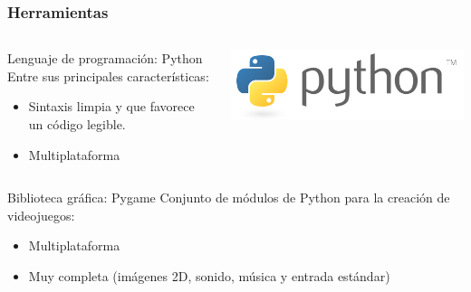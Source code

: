 \begin{frame}
    \frametitle{Herramientas}

    \begin{columns}
    
        \column{200px}
        \begin{block}{Lenguaje de programación: Python}
        Entre sus principales características:
            \begin{itemize}
                \item Sintaxis limpia y que favorece un código legible.
                \item Multiplataforma
            \end{itemize}

        \end{block}
        
        \column{100px}

        \begin{center}
                \includegraphics[scale=0.22]{imagenes/logo_python.png}
        \end{center}
        
    \end{columns}

    \begin{columns}
    
        \column{200px}

        \begin{block}{Biblioteca gráfica: Pygame}
        Conjunto de módulos de Python para la creación de videojuegos:
            \begin{itemize}
                \item Multiplataforma %
                \item Muy completa (imágenes 2D, sonido, música y entrada estándar)
            \end{itemize}
        \end{block}
        

\end{columns}
\end{frame}
